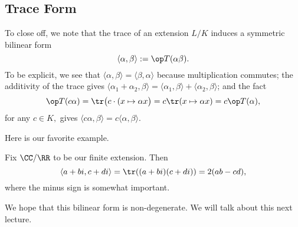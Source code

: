 

\subsection{Trace Form}
To close off, we note that the trace of an extension $L/K$ induces a symmetric bilinear form
\[\langle\alpha,\beta\rangle:=\op T(\alpha\beta).\]
To be explicit, we see that $\langle\alpha,\beta\rangle=\langle\beta,\alpha\rangle$ because multiplication commutes; the additivity of the trace gives $\langle\alpha_1+\alpha_2,\beta\rangle=\langle\alpha_1,\beta\rangle+\langle\alpha_2,\beta\rangle$; and the fact
\[\op T(c\alpha)=\tr\big(c\cdot(x\mapsto\alpha x\big)=c\tr(x\mapsto\alpha x)=c\op T(\alpha),\]
for any $c\in K,$ gives $\langle c\alpha,\beta\rangle=c\langle\alpha,\beta\rangle.$

Here is our favorite example.
\begin{example}
	Fix $\CC/\RR$ to be our finite extension. Then
	\[\langle a+bi,c+di\rangle=\tr ((a+bi)(c+di))=2(ab-cd),\]
	where the minus sign is somewhat important.
\end{example}
We hope that this bilinear form is non-degenerate. We will talk about this next lecture.